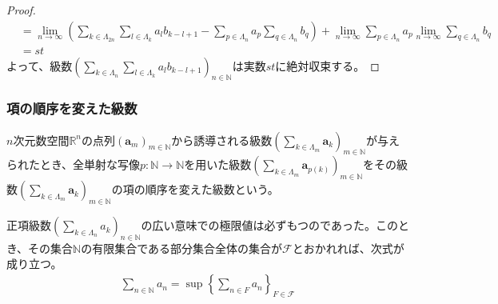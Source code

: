 \documentclass[dvipdfmx]{jsarticle}
\begin{document}
\begin{proof}
\begin{align*}
&= \lim_{n \rightarrow \infty}\left( \sum_{k \in \varLambda_{2n}} {\sum_{l \in \varLambda_{k}} {a_{l}b_{k - l + 1}}} - \sum_{p \in \varLambda_{n}} a_{p}\sum_{q \in \varLambda_{n} } b_{q} \right) + \lim_{n \rightarrow \infty}{\sum_{p \in \varLambda_{n}} a_{p}}\lim_{n \rightarrow \infty}{\sum_{q \in \varLambda_{n} } b_{q}}\\
&= st
\end{align*}
よって、級数$\left( \sum_{k \in \varLambda_{n}} {\sum_{l \in \varLambda_{k}} {a_{l}b_{k - l + 1}}} \right)_{n \in \mathbb{N}}$は実数$st$に絶対収束する。
\end{proof}
\subsubsection{項の順序を変えた級数}%
\begin{dfn}
$n$次元数空間$\mathbb{R}^{n}$の点列$\left( \mathbf{a}_{m} \right)_{m \in \mathbb{N}}$から誘導される級数$\left( \sum_{k \in \varLambda_{m}} \mathbf{a}_{k} \right)_{m \in \mathbb{N}}$が与えられたとき、全単射な写像$p:\mathbb{N} \rightarrow \mathbb{N}$を用いた級数$\left( \sum_{k \in \varLambda_{m}} \mathbf{a}_{p(k)} \right)_{m \in \mathbb{N}}$をその級数$\left( \sum_{k \in \varLambda_{m}} \mathbf{a}_{k} \right)_{m \in \mathbb{N}}$の項の順序を変えた級数という。
\end{dfn}
\begin{thm}\label{4.1.8.19}
正項級数$\left( \sum_{k \in \varLambda_{n}} a_{k} \right)_{n \in \mathbb{N}}$の広い意味での極限値は必ずもつのであった。このとき、その集合$\mathbb{N}$の有限集合である部分集合全体の集合が$\mathcal{F}$とおかれれば、次式が成り立つ。
\begin{align*}
\sum_{n \in \mathbb{N}} a_{n} = \sup\left\{ \sum_{n \in F} a_{n} \right\}_{F\in \mathcal{F}}
\end{align*}
\end{thm}
\end{document}
